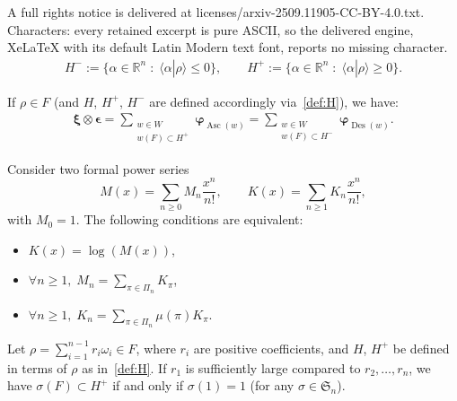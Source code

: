 \documentclass[10pt,a4paper]{amsart}
\DeclareMathOperator{\asc}{Asc}
\DeclareMathOperator{\des}{Des}
\newcommand{\bepsilon}{\boldsymbol{\epsilon}}
\newcommand{\bphi}{\boldsymbol{\varphi}}
\newcommand{\bxi}{\boldsymbol{\xi}}
\begin{document}
A full rights notice is delivered at licenses/arxiv-2509.11905-CC-BY-4.0.txt. Characters: every retained excerpt is pure ASCII, so the delivered engine, XeLaTeX with its default Latin Modern text font, reports no missing character.
\begin{align} \label{def:H}
    H^- := \big\{ \alpha \in \mathbb{R}^n \;:\; \langle \alpha | \rho \rangle \leq 0 \big\},  
    \qquad
    H^+ := \big\{ \alpha \in \mathbb{R}^n \;:\; \langle \alpha | \rho \rangle \geq 0 \big\}.
\end{align}

\begin{theo} \label{theo4}
    If $\rho \in F$ (and $H$, $H^+$, $H^-$ are defined accordingly via~\eqref{def:H}), we have:
    \begin{align} \label{eq:theo_desc_asc}
        \bxi \otimes \bepsilon
        =
        \sum_{\substack{w\in W \\ w(F) \subset H^+}}
        \bphi_{\asc(w)}
        =
        \sum_{\substack{w\in W \\ w(F) \subset H^-}}
        \bphi_{\des(w)}.
    \end{align}
\end{theo}

\begin{lemm} \label{lemm:momentcumulant}
    Consider two formal power series
    \[
        M(x) = \sum_{n\geq 0} M_n \frac{x^n}{n!},
            \qquad
        K(x) = \sum_{n\geq 1} K_n \frac{x^n}{n!},
    \]
    with $M_0=1$.  The following conditions are equivalent:
    \begin{itemize}
        \item $K(x) = \log(M(x))$,
        \item $\forall n \geq 1, \; M_n = \sum_{\pi \in \Pi_n} K_\pi$,
        \item
        $\forall n \geq 1, \; K_n = \sum_{\pi \in \Pi_n} \mu(\pi) K_\pi$.
    \end{itemize}
\end{lemm}

\begin{prop} \label{prop:CCP_Sn}
    Let $\rho = \sum_{i=1}^{n-1} r_i \omega_i \in F$,
    where $r_i$ are positive coefficients, and $H$, $H^+$ be defined in terms of $\rho$ as in~\eqref{def:H}.  If $r_1$ is sufficiently large compared to $r_2,\dots,r_n$, we have $\sigma(F) \subset H^+$ if and only if $\sigma(1) = 1$ (for any $\sigma \in \mathfrak{S}_n$).
\end{prop}
\end{document}
